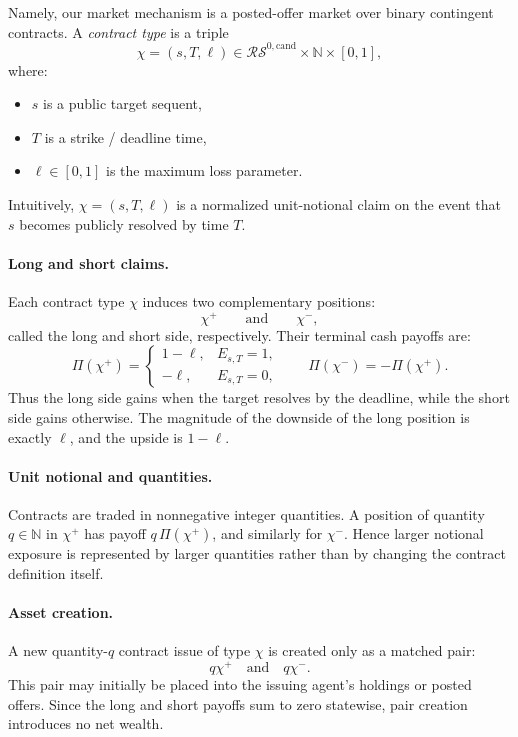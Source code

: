 Namely, our market mechanism is a posted-offer market over binary contingent contracts. A \emph{contract type} is a triple
\[
\chi=(s,T,\ell)\in \mathcal{RS}^{0,\mathrm{cand}}\times \mathbb N \times [0,1],
\]
where:
\begin{itemize}
    \item $s$ is a public target sequent,
    \item $T$ is a strike / deadline time,
    \item $\ell\in[0,1]$ is the maximum loss parameter.
\end{itemize}

Intuitively, $\chi=(s,T,\ell)$ is a normalized unit-notional claim on the event that $s$ becomes publicly resolved by time $T$.

\paragraph{Long and short claims.}
Each contract type $\chi$ induces two complementary positions:
\[
\chi^{+} \qquad\text{and}\qquad \chi^{-},
\]
called the long and short side, respectively. Their terminal cash payoffs are:
\[
\Pi(\chi^+) =
\begin{cases}
1-\ell, & E_{s,T}=1,\\
-\ell, & E_{s,T}=0,
\end{cases}
\qquad
\Pi(\chi^-) = -\Pi(\chi^+).
\]
Thus the long side gains when the target resolves by the deadline, while the short side gains otherwise. The magnitude of the downside of the long position is exactly $\ell$, and the upside is $1-\ell$.

\paragraph{Unit notional and quantities.}
Contracts are traded in nonnegative integer quantities. A position of quantity $q\in\mathbb N$ in $\chi^+$ has payoff $q\,\Pi(\chi^+)$, and similarly for $\chi^-$. Hence larger notional exposure is represented by larger quantities rather than by changing the contract definition itself.

\paragraph{Asset creation.}
A new quantity-$q$ contract issue of type $\chi$ is created only as a matched pair:
\[
q\chi^+ \quad\text{and}\quad q\chi^-.
\]
This pair may initially be placed into the issuing agent's holdings or posted offers. Since the long and short payoffs sum to zero statewise, pair creation introduces no net wealth.

